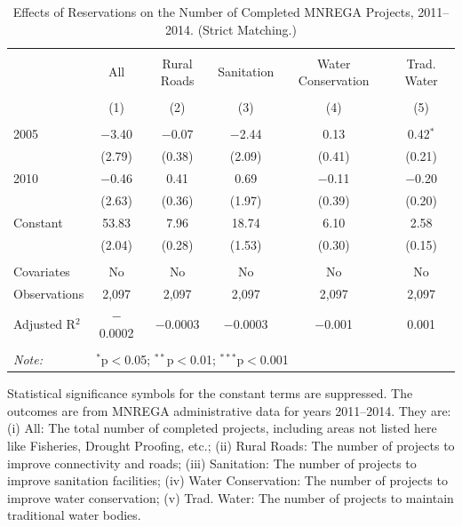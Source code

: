 \begin{table}[!htbp]
\centering
\begin{threeparttable}

  \caption{Effects of Reservations on the Number of Completed MNREGA Projects, 2011--2014. (Strict Matching.)} 
  \label{main_mnrega_strict} 
\scriptsize 
\begin{tabular}{@{\extracolsep{0pt}}lccccc} 
\\[-1.8ex]\hline 
\hline \\[-1.8ex] 
 & All & Rural Roads & Sanitation & Water Conservation & Trad. Water \\ 
\\[-1.8ex] & (1) & (2) & (3) & (4) & (5)\\ 
\hline \\[-1.8ex] 
 2005 & $-$3.40 & $-$0.07 & $-$2.44 & 0.13 & 0.42$^{*}$ \\ 
  & (2.79) & (0.38) & (2.09) & (0.41) & (0.21) \\ 
  2010 & $-$0.46 & 0.41 & 0.69 & $-$0.11 & $-$0.20 \\ 
  & (2.63) & (0.36) & (1.97) & (0.39) & (0.20) \\ 
  Constant & 53.83 & 7.96 & 18.74 & 6.10 & 2.58 \\ 
  & (2.04) & (0.28) & (1.53) & (0.30) & (0.15) \\ 
 \hline \\[-1.8ex] 
Covariates & No & No & No & No & No \\ 
Observations & 2,097 & 2,097 & 2,097 & 2,097 & 2,097 \\ 
Adjusted R$^{2}$ & $-$0.0002 & $-$0.0003 & $-$0.0003 & $-$0.001 & 0.001 \\ 
\hline 
\hline \\[-1.8ex] 
\textit{Note:}  & \multicolumn{5}{l}{$^{*}$p$<$0.05; $^{**}$p$<$0.01; $^{***}$p$<$0.001} \\ 
\end{tabular} 
\begin{tablenotes}[flushleft]
\scriptsize
\item[] Statistical significance symbols for the constant terms are suppressed. The outcomes are from MNREGA administrative data for years 2011--2014. They are: 
(i) All: The total number of completed projects, including areas not listed here like Fisheries, Drought Proofing, etc.;
(ii) Rural Roads: The number of projects to improve connectivity and roads;
(iii) Sanitation: The number of projects to improve sanitation facilities;
(iv) Water Conservation: The number of projects to improve water conservation;
(v) Trad. Water: The number of projects to maintain traditional water bodies.
\end{tablenotes}
\end{threeparttable}
\end{table}
